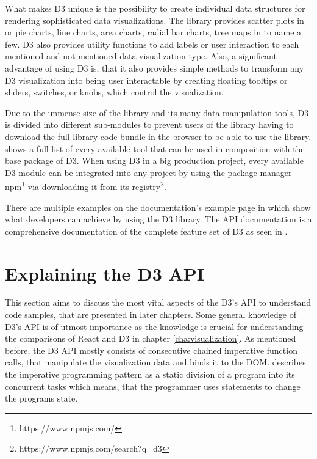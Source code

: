 What makes D3 unique is the possibility to create individual data structures for rendering sophisticated data visualizations. The library provides scatter plots in \cite[/d3-scale]{D3Github} or pie charts, line charts, area charts, radial bar charts, tree maps in \cite[/d3-shape]{D3Github} to name a few. D3 also provides utility functions to add labels or user interaction to each mentioned and not mentioned data visualization type. Also, a significant advantage of using D3 is, that it also provides simple methods to transform any D3 visualization into being user interactable by creating floating tooltips or sliders, switches, or knobs, which control the visualization.

Due to the immense size of the library and its many data manipulation tools, D3 is divided into different sub-modules to prevent users of the library having to download the full library code bundle in the browser to be able to use the library. \cite{D3Github} shows a full list of every available tool that can be used in composition with the base package of D3. When using D3 in a big production project, every available D3 module can be integrated into any project by using the package manager npm\footnote{https://www.npmjs.com/} via downloading it from its registry\footnote{https://www.npmjs.com/search?q=d3}.

\begin{emergency}{1em}
There are multiple examples on the documentation's example page in \cite{D3Examples} which show what developers can achieve by using the D3 library. The API documentation is a comprehensive documentation of the complete feature set of D3 as seen in \cite[\mbox{/d3/blob/master/API.md}]{D3Github}.
\end{emergency}


\section{Explaining the D3 API} 

This section aims to discuss the most vital aspects of the D3's API to understand code samples, that are presented in later chapters. Some general knowledge of D3's API is of utmost importance as the knowledge is crucial for understanding the comparisons of React and D3 in chapter \ref{cha:visualization}. As mentioned before, the D3 API mostly consists of consecutive chained imperative function calls, that manipulate the visualization data and binds it to the DOM. \cite[P.\ 625]{prgLngDesignImpl} describes the imperative programming pattern as a static division of a program into its concurrent tasks which means, that the programmer uses statements to change the programs state. 

